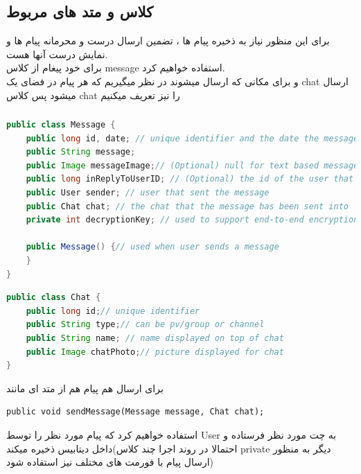 \documentclass[12pt]{article}
\begin{document}
\subsection{کلاس و متد های مربوط}
برای این منظور نیاز به ذخیره پیام ها ، تضمین ارسال درست
و محرمانه پیام ها و نمایش درست آنها هست.\\
برای خود پیغام از کلاس message استفاده خواهیم کرد.\\
و برای مکانی که ارسال میشوند در نظر میگیریم که هر پیام در
فضای یک chat ارسال میشود پس کلاس chat را نیز تعریف میکنیم
\begin{latin}
    \subsubsection*{}
    \begin{lstlisting}[language=Java, caption={Messages},label={lst:code}, mathescape=true, breaklines=true]
public class Message {
    public long id, date; // unique identifier and the date the message was sent
    public String message;
    public Image messageImage;// (Optional) null for text based messages
    public long inReplyToUserID; // (Optional) the id of the user that it was a reply to, null for original posts
    public User sender; // user that sent the message
    public Chat chat; // the chat that the message has been sent into
    private int decryptionKey; // used to support end-to-end encryption, not saved in the dataBase

    public Message() {// used when user sends a message
    }
}        
    \end{lstlisting}
    \begin{lstlisting}[language=Java, caption={unique chats},label={lst:code}, mathescape=true, breaklines=true]
public class Chat {
    public long id;// unique identifier
    public String type;// can be pv/group or channel
    public String name; // name displayed on top of chat
    public Image chatPhoto;// picture displayed for chat
}        
        \end{lstlisting}
\end{latin}
برای ارسال هم پیام هم از متد ای مانند
\begin{latin}
    \begin{verbatim}
public void sendMessage(Message message, Chat chat);
    \end{verbatim}
\end{latin}
استفاده خواهیم کرد که پیام مورد نظر را توسط User به چت
مورد نظر فرستاده و داخل دیتابیس ذخیره میکند(احتمالا در روند اجرا چند کلاس
private دیگر به منظور ارسال پیام با فورمت های مختلف نیز استفاده
شود)
\end{document}

